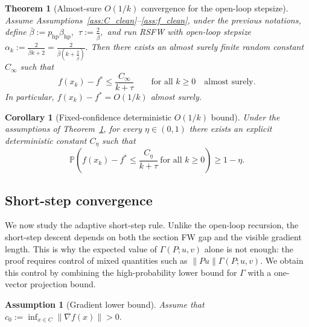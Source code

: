 \documentclass{article}
\newtheorem{assumption}{Assumption}
\newtheorem{theorem}{Theorem}
\newtheorem{corollary}{Corollary}
\begin{document}
\begin{theorem}[Almost-sure $O(1/k)$ convergence for the open-loop stepsize]
\label{thm:hp_open_loop_as}
Assume Assumptions~\ref{ass:C_clean}--\ref{ass:f_clean}, under the previous notations, define 
$\bar\beta:=p_{\mathrm{hp}}\beta_{\mathrm{hp}},\ \ 
\tau:=\frac{2}{\bar\beta},$
and run RSFW with open-loop stepsize $
\alpha_k:=\frac{2}{\bar\beta k+2}
=\frac{2}{\bar\beta\left(k+\frac{2}{\bar\beta}\right)}.$
Then there exists an almost surely finite random constant $C_\infty$ such that
\begin{equation}
f(x_k)-f^*\le \frac{C_\infty}{k+\tau}
\qquad\text{for all }k\ge 0
\quad\text{almost surely}.
\label{eq:as_ok_rate}
\end{equation}
In particular, $f(x_k)-f^*=O(1/k)$ almost surely.
\end{theorem}

\begin{corollary}[Fixed-confidence deterministic $O(1/k)$ bound]
\label{cor:hp_open_loop_deterministic}
Under the assumptions of Theorem~\ref{thm:hp_open_loop_as}, for every $\eta\in(0,1)$ there exists an explicit deterministic constant $C_\eta$ such that
\begin{equation}
\mathbb P\!\left(
f(x_k)-f^*\le \frac{C_\eta}{k+\tau}
\ \text{for all }k\ge 0
\right)\ge 1-\eta.
\label{eq:deterministic_confidence_rate}
\end{equation}
\end{corollary}


\subsection{Short-step convergence}
\label{sec:short_step}

We now study the adaptive short-step rule. Unlike the open-loop recursion, the short-step descent depends on both the section FW gap and the visible gradient length. This is why the expected value of \(\Gamma(P;u,v)\) alone is not enough: the proof requires control of mixed quantities such as \(\|Pu\|\Gamma(P;u,v)\). We obtain this control by combining the
high-probability lower bound for \(\Gamma\) with a one-vector projection bound.

\begin{assumption}[Gradient lower bound]
\label{ass:grad_lower}
Assume  that $
c_0:=\inf_{x\in C}\|\nabla f(x)\|>0.$
\end{assumption}
\end{document}
